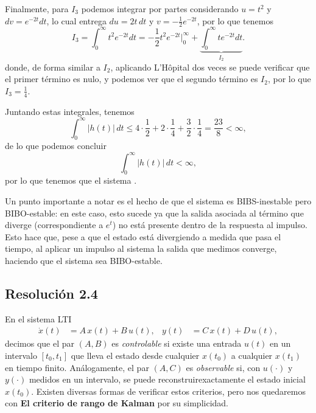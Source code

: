 \documentclass[
  11pt,
  letterpaper,
   addpoints,
   answers
  ]{exam}
\begin{document}
\begin{questions}
\begin{solution}
Finalmente, para $I_3$ podemos integrar por partes considerando $u=t^{2}$ y $dv=e^{-2t}dt$, lo cual entrega
$du=2t\,dt$ y $v=-\tfrac{1}{2}e^{-2t}$, por lo que tenemos
\begin{equation}
I_3=\int_{0}^{\infty} t^{2}e^{-2t}dt
=-\frac{1}{2}t^{2}e^{-2t}\Big|_{0}^{\infty}
+\underbrace{\int_{0}^{\infty} t e^{-2t}dt}_{I_2}.
\end{equation}
donde, de forma similar a $I_2$, aplicando L'H\^opital dos veces se puede verificar que el primer término
es nulo, y podemos ver que el segundo término es $I_2$, por lo que $I_3=\tfrac{1}{4}$.

Juntando estas integrales, tenemos
\begin{equation}
\int_{0}^{\infty} |h(t)|\,dt
\le 4\cdot\frac{1}{2}+2\cdot\frac{1}{4}+\frac{3}{2}\cdot\frac{1}{4}
= \frac{23}{8} < \infty,
\end{equation}
de lo que podemos concluir
\begin{equation}
\int_{0}^{\infty} |h(t)|\,dt < \infty,
\end{equation}
por lo que tenemos que el sistema .

Un punto importante a notar es el hecho de que el sistema es BIBS-inestable pero BIBO-estable:
en este caso, esto sucede ya que la salida asociada al término que diverge (correspondiente a $e^{t}$) no
está presente dentro de la respuesta al impulso. Esto hace que, pese a que el estado está divergiendo a
medida que pasa el tiempo, al aplicar un impulso al sistema la salida que medimos converge, haciendo
que el sistema sea BIBO-estable.
\subsection*{Resolución 2.4}


En el sistema LTI
\begin{align}
\dot x(t) &= A\,x(t) + B\,u(t), &
y(t) &= C\,x(t) + D\,u(t),
\end{align}
decimos que el par $(A,B)$ es \emph{controlable} si existe una entrada $u(t)$ en un intervalo $[t_0,t_1]$ que lleva el estado desde cualquier $x(t_0)$ a cualquier $x(t_1)$ en tiempo finito. Análogamente, el par $(A,C)$ es \emph{observable} si, con $u(\cdot)$ y $y(\cdot)$ medidos en un intervalo, se puede reconstruirexactamente el estado inicial $x(t_0)$. Existen diversas formas de verificar estos criterios, pero nos quedaremos con \textbf{El criterio de rango de Kalman} por su simplicidad.


\end{solution}
\end{questions}
\end{document}
